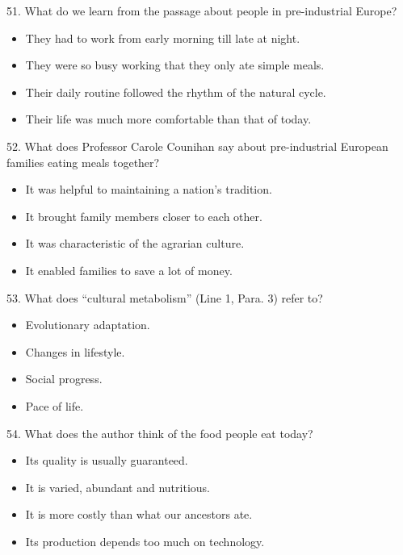 \documentclass[UTF8,11pt]{ctexart}
\begin{document}
51. What do we learn from the passage about people in pre-industrial Europe?


\begin{itemize}[leftmargin=2em,itemsep=.2em,topsep=.4em]\item[A.] They had to work from early morning till late at night.
\item[B.] They were so busy working that they only ate simple meals.
\item[C.] Their daily routine followed the rhythm of the natural cycle.
\item[D.] Their life was much more comfortable than that of today.
\end{itemize}

52. What does Professor Carole Counihan say about pre-industrial European families eating meals together?


\begin{itemize}[leftmargin=2em,itemsep=.2em,topsep=.4em]\item[A.] It was helpful to maintaining a nation’s tradition.
\item[B.] It brought family members closer to each other.
\item[C.] It was characteristic of the agrarian culture.
\item[D.] It enabled families to save a lot of money.
\end{itemize}

53. What does “cultural metabolism” (Line 1, Para. 3) refer to?


\begin{itemize}[leftmargin=2em,itemsep=.2em,topsep=.4em]\item[A.] Evolutionary adaptation.
\item[B.] Changes in lifestyle.
\end{itemize}

\begin{itemize}[leftmargin=2em,itemsep=.2em,topsep=.4em]\item[C.] Social progress.
\item[D.] Pace of life.
\end{itemize}

54. What does the author think of the food people eat today?


\begin{itemize}[leftmargin=2em,itemsep=.2em,topsep=.4em]\item[A.] Its quality is usually guaranteed.
\item[B.] It is varied, abundant and nutritious.
\item[C.] It is more costly than what our ancestors ate.
\item[D.] Its production depends too much on technology.
\end{itemize}
\end{document}
